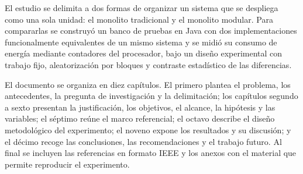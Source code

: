 El estudio se delimita a dos formas de organizar un sistema que se despliega como una sola unidad: el monolito tradicional y el monolito modular. Para compararlas se construyó un banco de pruebas en Java con dos implementaciones funcionalmente equivalentes de un mismo sistema y se midió su consumo de energía mediante contadores del procesador, bajo un diseño experimental con trabajo fijo, aleatorización por bloques y contraste estadístico de las diferencias.

El documento se organiza en diez capítulos. El primero plantea el problema, los antecedentes, la pregunta de investigación y la delimitación; los capítulos segundo a sexto presentan la justificación, los objetivos, el alcance, la hipótesis y las variables; el séptimo reúne el marco referencial; el octavo describe el diseño metodológico del experimento; el noveno expone los resultados y su discusión; y el décimo recoge las conclusiones, las recomendaciones y el trabajo futuro. Al final se incluyen las referencias en formato IEEE y los anexos con el material que permite reproducir el experimento.
